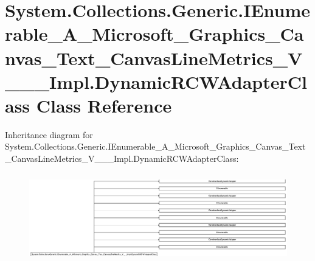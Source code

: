 \hypertarget{class_system_1_1_collections_1_1_generic_1_1_i_enumerable___a___microsoft___graphics___canvas___85f9ab601defba67187690642d4e8f5a}{}\section{System.\+Collections.\+Generic.\+I\+Enumerable\+\_\+\+A\+\_\+\+Microsoft\+\_\+\+Graphics\+\_\+\+Canvas\+\_\+\+Text\+\_\+\+Canvas\+Line\+Metrics\+\_\+\+V\+\_\+\+\_\+\+\_\+\+Impl.\+Dynamic\+R\+C\+W\+Adapter\+Class Class Reference}
\label{class_system_1_1_collections_1_1_generic_1_1_i_enumerable___a___microsoft___graphics___canvas___85f9ab601defba67187690642d4e8f5a}
Inheritance diagram for System.\+Collections.\+Generic.\+I\+Enumerable\+\_\+\+A\+\_\+\+Microsoft\+\_\+\+Graphics\+\_\+\+Canvas\+\_\+\+Text\+\_\+\+Canvas\+Line\+Metrics\+\_\+\+V\+\_\+\+\_\+\+\_\+\+Impl.\+Dynamic\+R\+C\+W\+Adapter\+Class\+:\begin{figure}[H]
\begin{center}
\leavevmode
\includegraphics[height=3.874214cm]{class_system_1_1_collections_1_1_generic_1_1_i_enumerable___a___microsoft___graphics___canvas___85f9ab601defba67187690642d4e8f5a}
\end{center}
\end{figure}
